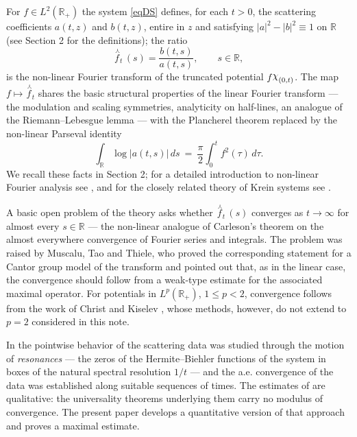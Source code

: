 \documentclass[11pt,twoside,reqno]{amsart}
\def\to{\rightarrow}
\def \nlhat {\overset{\ \curlywedge}}
\def\R{{\mathbb R}}
\newcommand{\charf}{\raisebox{\depth}{\(\chi\)}}
\theoremstyle{plain}
\numberwithin{equation}{section}
\begin{document}
For $f\in L^2(\R_+)$ the system \eqref{eqDS} defines, for each $t>0$, the scattering coefficients $a(t,z)$ and $b(t,z)$, entire in $z$ and satisfying $|a|^2-|b|^2\equiv1$ on $\R$ (see Section 2 for the definitions); the ratio
$$\nlhat f_t\,(s)=\frac{b(t,s)}{a(t,s)},\qquad s\in\R,$$
is the non-linear Fourier transform of the truncated potential $f\charf_{(0,t)}$. The map $f\mapsto\nlhat f_t$ shares the basic structural properties of the linear Fourier transform --- the modulation and scaling symmetries, analyticity on half-lines, an analogue of the Riemann--Lebesgue lemma --- with the Plancherel theorem replaced by the non-linear Parseval identity
$$\int_\R\log|a(t,s)|\,ds\ =\ \frac\pi2\int_0^t f^2(\tau)\,d\tau .$$
We recall these facts in Section 2; for a detailed introduction to non-linear Fourier analysis see \cite{TT}, and for the closely related theory of Krein systems see \cite{Den}.

A basic open problem of the theory asks whether $\nlhat f_t\,(s)$ converges as $t\to\infty$ for almost every $s\in\R$ --- the non-linear analogue of Carleson's theorem \cite{C} on the almost everywhere convergence of Fourier series and integrals. The problem was raised by Muscalu, Tao and Thiele, who proved the corresponding statement for a Cantor group model of the transform \cite{MTT} and pointed out that, as in the linear case, the convergence should follow from a weak-type estimate for the associated maximal operator. For potentials in $L^p(\R_+)$, $1\leq p<2$, convergence follows from the work of Christ and Kiselev \cite{CK,CK1}, whose methods, however, do not extend to $p=2$ considered in this note. 

In \cite{Scatter} the pointwise behavior of the scattering data was studied through the motion of {\it resonances} --- the zeros of the Hermite--Biehler functions of the system in boxes of the natural spectral resolution $1/t$ --- and the a.e. convergence of the data was established along suitable sequences of times. The estimates of \cite{Scatter} are qualitative: the universality theorems underlying them carry no modulus of convergence. The present paper develops a quantitative version of that approach and proves a maximal estimate.
\end{document}
